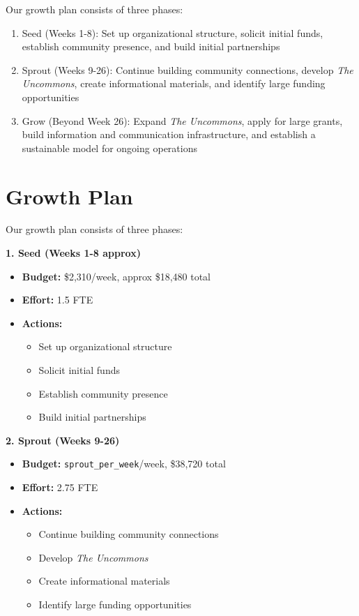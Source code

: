\documentclass[
  letterpaper,
  DIV=11,
  numbers=noendperiod]{scrreprt}
\providecommand{\tightlist}{%
  \setlength{\itemsep}{0pt}\setlength{\parskip}{0pt}}\usepackage{longtable,booktabs,array}
\begin{document}
Our growth plan consists of three phases:

\begin{enumerate}
\def\labelenumi{\arabic{enumi}.}
\tightlist
\item
  Seed (Weeks 1-8): Set up organizational structure, solicit initial
  funds, establish community presence, and build initial partnerships
\item
  Sprout (Weeks 9-26): Continue building community connections, develop
  \emph{The Uncommons}, create informational materials, and identify
  large funding opportunities
\item
  Grow (Beyond Week 26): Expand \emph{The Uncommons}, apply for large
  grants, build information and communication infrastructure, and
  establish a sustainable model for ongoing operations
\end{enumerate}

\section{Growth Plan}\label{sec-aagu_growth_plan}

Our growth plan consists of three phases:

\textbf{1. Seed (Weeks 1-8 approx)}

\begin{itemize}
\tightlist
\item
  \textbf{Budget:} \$2,310/week, approx \$18,480 total
\item
  \textbf{Effort:} 1.5 FTE
\item
  \textbf{Actions:}

  \begin{itemize}
  \tightlist
  \item
    Set up organizational structure
  \item
    Solicit initial funds
  \item
    Establish community presence
  \item
    Build initial partnerships
  \end{itemize}
\end{itemize}

\textbf{2. Sprout (Weeks 9-26)}

\begin{itemize}
\tightlist
\item
  \textbf{Budget:} \texttt{sprout\_per\_week}/week, \$38,720 total
\item
  \textbf{Effort:} 2.75 FTE
\item
  \textbf{Actions:}

  \begin{itemize}
  \tightlist
  \item
    Continue building community connections
  \item
    Develop \emph{The Uncommons}
  \item
    Create informational materials
  \item
    Identify large funding opportunities
  \end{itemize}
\end{itemize}
\end{document}
